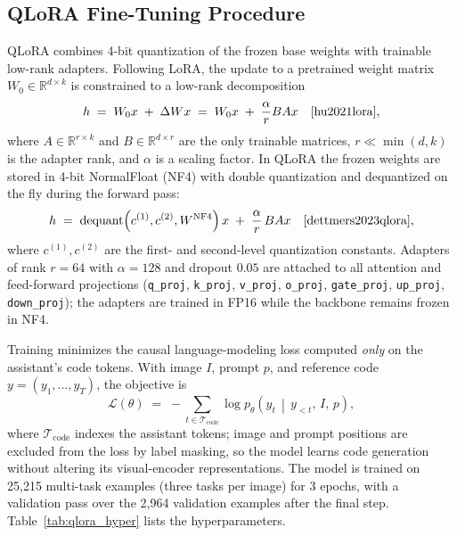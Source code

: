 \subsection{QLoRA Fine-Tuning Procedure}

QLoRA combines 4-bit quantization of the frozen base weights with trainable
low-rank adapters. Following LoRA, the update to a pretrained weight matrix
$W_0 \in \mathbb{R}^{d \times k}$ is constrained to a low-rank decomposition
\begin{equation}
h \;=\; W_0 x \;+\; \Delta W x \;=\; W_0 x \;+\; \frac{\alpha}{r} B A x
\quad \cite{hu2021lora},
\label{eq:lora}
\end{equation}
where $A \in \mathbb{R}^{r \times k}$ and $B \in \mathbb{R}^{d \times r}$ are
the only trainable matrices, $r \ll \min(d,k)$ is the adapter rank, and
$\alpha$ is a scaling factor. In QLoRA the frozen weights are stored in 4-bit
NormalFloat (NF4) with double quantization and dequantized on the fly during
the forward pass:
\begin{equation}
h \;=\; \mathrm{dequant}\!\left(c^{(1)}, c^{(2)}, W^{\mathrm{NF4}}\right) x
\;+\; \frac{\alpha}{r}\, B A x \quad \cite{dettmers2023qlora},
\label{eq:qlora}
\end{equation}
where $c^{(1)}, c^{(2)}$ are the first- and second-level quantization
constants. Adapters of rank $r{=}64$ with $\alpha{=}128$ and dropout $0.05$
are attached to all attention and feed-forward projections (\texttt{q\_proj},
\texttt{k\_proj}, \texttt{v\_proj}, \texttt{o\_proj}, \texttt{gate\_proj},
\texttt{up\_proj}, \texttt{down\_proj}); the adapters are trained in FP16 while
the backbone remains frozen in NF4.

Training minimizes the causal language-modeling loss computed \emph{only} on
the assistant's code tokens. With image $I$, prompt $p$, and reference code
$y = (y_1, \dots, y_T)$, the objective is
\begin{equation}
\mathcal{L}(\theta) \;=\; -\sum_{t \in \mathcal{T}_{\mathrm{code}}}
\log p_\theta\!\left(y_t \,\middle|\, y_{<t},\, I,\, p\right),
\label{eq:loss}
\end{equation}
where $\mathcal{T}_{\mathrm{code}}$ indexes the assistant tokens; image and
prompt positions are excluded from the loss by label masking, so the model
learns code generation without altering its visual-encoder representations.
The model is trained on 25,215 multi-task examples (three tasks per image) for
3 epochs, with a validation pass over the 2,964 validation examples after the
final step. Table~\ref{tab:qlora_hyper} lists the hyperparameters.

